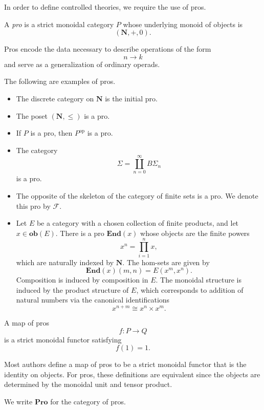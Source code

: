 \documentclass{tac}
\begin{document}
In order to define controlled theories, we require the use of pros.

\begin{definition}
A \emph{pro} is a strict monoidal category $P$ whose underlying monoid of objects is
\[
(\mathbf{N},+,0).
\]
\end{definition}

Pros encode the data necessary to describe operations of the form
\[
n\to k
\]
and serve as a generalization of ordinary operads.

\begin{example}\label{examples of pros}
The following are examples of pros.
\begin{itemize}
    \item The discrete category on $\mathbf{N}$ is the initial pro.
    \item The poset $(\mathbf{N},\leq)$ is a pro.
    \item If $P$ is a pro, then $P^{\mathrm{op}}$ is a pro.
    \item The category
    \[
    \Sigma=\coprod_{n=0}^{\infty}B\Sigma_n
    \]
    is a pro.
    \item The opposite of the skeleton of the category of finite sets is a pro. We denote this pro by $\mathcal{F}$.
    \item Let $E$ be a category with a chosen collection of finite products, and let $x\in\mathbf{ob}(E)$. There is a pro $\mathbf{End}(x)$ whose objects are the finite powers
    \[
    x^n=\prod_{i=1}^{n}x,
    \]
    which are naturally indexed by $\mathbf{N}$. The hom-sets are given by
    \[
    \mathbf{End}(x)(m,n)=E(x^m,x^n).
    \]
    Composition is induced by composition in $E$. The monoidal structure is induced by the product structure of $E$, which corresponds to addition of natural numbers via the canonical identifications
    \[
    x^{n+m}\cong x^n\times x^m.
    \]
\end{itemize}
\end{example}

\begin{definition}
A map of pros
\[
f:P\to Q
\]
is a strict monoidal functor satisfying
\[
f(1)=1.
\]
\end{definition}

Most authors define a map of pros to be a strict monoidal functor that is the identity on objects. For pros, these definitions are equivalent since the objects are determined by the monoidal unit and tensor product.

\begin{notation}
We write $\mathbf{Pro}$ for the category of pros.
\end{notation}
\end{document}
